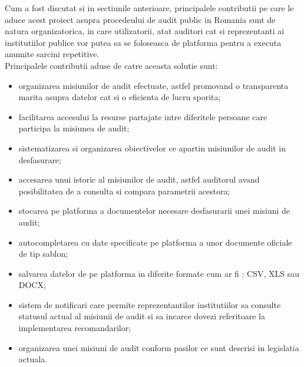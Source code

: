 Cum a fost discutat si in sectiunile anterioare, principalele contributii pe care le aduce acest proiect asupra procedeului de audit public in Romania sunt de natura organizatorica, in care utilizatorii, atat auditori cat si reprezentanti ai institutiilor publice vor putea sa se foloseasca de platforma pentru a executa anumite sarcini repetitive.\\
Principalele contributii aduse de catre aceasta solutie sunt:
\begin{itemize}
	
	\item  organizarea misiunilor de audit efectuate, astfel promovand o transparenta marita asupra datelor cat si o eficienta de lucru sporita;
	
	\item facilitarea accesului la resurse partajate intre diferitele persoane care participa la misiunea de audit;
	
	\item sistematizarea  si organizarea obiectivelor ce apartin misiunilor de audit in desfasurare;
	
	\item accesarea unui istoric al misiunilor de audit, astfel auditorul avand posibilitatea de a consulta si compara parametrii acestora;
	
	\item stocarea pe platforma a documentelor necesare desfasurarii unei misiuni de audit;
	
	\item autocompletarea cu date specificate pe platforma a unor documente oficiale de tip sablon;
	
	\item salvarea datelor de pe platforma in diferite formate cum ar fi : CSV, XLS sau DOCX;
	
	\item sistem de notificari care permite reprezentantilor institutiilor sa consulte statusul actual al misiunii de audit si sa incarce dovezi referitoare la implementarea recomandarilor;
	
	\item organizarea unei misiuni de audit conform pasilor ce sunt descrisi in legislatia actuala.
	
\end{itemize}


